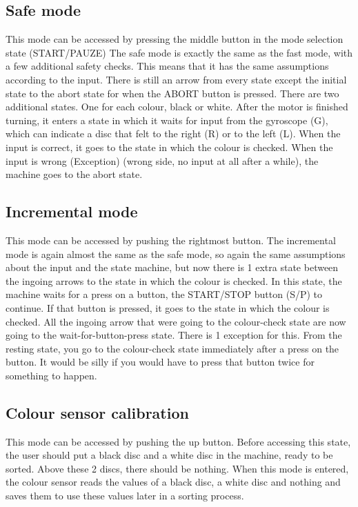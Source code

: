 \documentclass[a4paper,oneside,11pt]{article}
\begin{document}
\newpage

\subsection{Safe mode}
This mode can be accessed by pressing the middle button in the mode selection state (START/PAUZE) The safe mode is exactly the same as the fast mode, with a few additional safety checks. This means that it has the same assumptions according to the input. There is still an arrow from every state except the initial state to the abort state for when the ABORT button is pressed. There are two additional states. One for each colour, black or white. After the motor is finished turning, it enters a state in which it waits for input from the gyroscope (G), which can indicate a disc that felt to the right (R) or to the left (L). When the input is correct, it goes to the state in which the colour is checked. When the input is wrong (Exception) (wrong side, no input at all after a while), the machine goes to the abort state.
\subsection{Incremental mode}
This mode can be accessed by pushing the rightmost button. The incremental mode is again almost the same as the safe mode, so again the same assumptions about the input and the state machine, but now there is 1 extra state between the ingoing arrows to the state in which the colour is checked. In this state, the machine waits for a press on a button, the START/STOP button (S/P) to continue. If that button is pressed, it goes to the state in which the colour is checked. All the ingoing arrow that were going to the colour-check state are now going to the wait-for-button-press state. There is 1 exception for this. From the resting state, you go to the colour-check state immediately after a press on the button. It would be silly if you would have to press that button twice for something to happen.

\subsection{Colour sensor calibration}
This mode can be accessed by pushing the up button. Before accessing this state, the user should put a black disc and a white disc in the machine, ready to be sorted. Above these 2 discs, there should be nothing. When this mode is entered, the colour sensor reads the values of a black disc, a white disc and nothing and saves them to use these values later in a sorting process.
\end{document}
